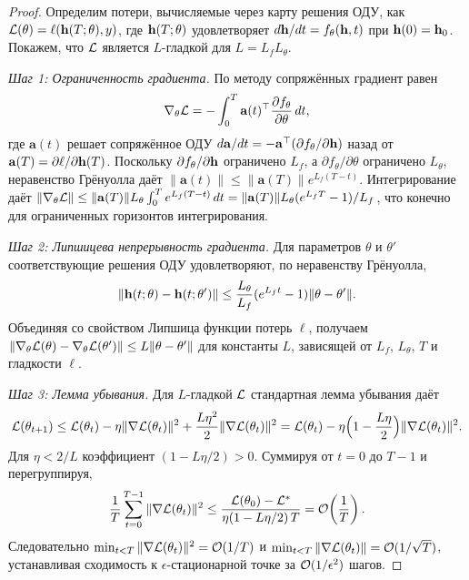 \begin{proof}
Определим потери, вычисляемые через карту решения ОДУ, как $\mathcal{L}(\theta) = \ell(\mathbf{h}(T;\theta),y)$, где $\mathbf{h}(T;\theta)$ удовлетворяет $d\mathbf{h}/dt = f_\theta(\mathbf{h},t)$ при $\mathbf{h}(0)=\mathbf{h}_0$. Покажем, что $\mathcal{L}$ является $L$-гладкой для $L = L_f L_\theta$.

\textit{Шаг 1: Ограниченность градиента.} По методу сопряжённых градиент равен
\begin{equation}
\nabla_\theta\mathcal{L} = -\int_0^T \mathbf{a}(t)^\top \frac{\partial f_\theta}{\partial\theta}\,dt,
\end{equation}
где $\mathbf{a}(t)$ решает сопряжённое ОДУ $d\mathbf{a}/dt = -\mathbf{a}^\top(\partial f_\theta/\partial\mathbf{h})$ назад от $\mathbf{a}(T)=\partial\ell/\partial\mathbf{h}(T)$. Поскольку $\partial f_\theta/\partial\mathbf{h}$ ограничено $L_f$, а $\partial f_\theta/\partial\theta$ ограничено $L_\theta$, неравенство Грёнуолла даёт $\|\mathbf{a}(t)\|\le\|\mathbf{a}(T)\|e^{L_f(T-t)}$. Интегрирование даёт $\|\nabla_\theta\mathcal{L}\|\le \|\mathbf{a}(T)\|L_\theta\int_0^T e^{L_f(T-t)}\,dt = \|\mathbf{a}(T)\|L_\theta(e^{L_f T}-1)/L_f$, что конечно для ограниченных горизонтов интегрирования.

\textit{Шаг 2: Липшицева непрерывность градиента.} Для параметров $\theta$ и $\theta'$ соответствующие решения ОДУ удовлетворяют, по неравенству Грёнуолла,
\begin{equation}
\|\mathbf{h}(t;\theta)-\mathbf{h}(t;\theta')\| \le \frac{L_\theta}{L_f}(e^{L_f t}-1)\|\theta-\theta'\|.
\end{equation}
Объединяя со свойством Липшица функции потерь $\ell$, получаем $\|\nabla_\theta\mathcal{L}(\theta)-\nabla_\theta\mathcal{L}(\theta')\| \le L\|\theta-\theta'\|$ для константы $L$, зависящей от $L_f$, $L_\theta$, $T$ и гладкости $\ell$.

\textit{Шаг 3: Лемма убывания.} Для $L$-гладкой $\mathcal{L}$ стандартная лемма убывания даёт
\begin{equation}
\mathcal{L}(\theta_{t+1}) \le \mathcal{L}(\theta_t) - \eta\|\nabla\mathcal{L}(\theta_t)\|^2 + \frac{L\eta^2}{2}\|\nabla\mathcal{L}(\theta_t)\|^2
= \mathcal{L}(\theta_t) - \eta\Bigl(1-\frac{L\eta}{2}\Bigr)\|\nabla\mathcal{L}(\theta_t)\|^2.
\end{equation}
Для $\eta < 2/L$ коэффициент $(1-L\eta/2)>0$. Суммируя от $t=0$ до $T-1$ и перегруппируя,
\begin{equation}
\frac{1}{T}\sum_{t=0}^{T-1}\|\nabla\mathcal{L}(\theta_t)\|^2
\le \frac{\mathcal{L}(\theta_0)-\mathcal{L}^*}{\eta(1-L\eta/2)\,T}
= \mathcal{O}\!\left(\frac{1}{T}\right).
\end{equation}
Следовательно $\min_{t<T}\|\nabla\mathcal{L}(\theta_t)\|^2 = \mathcal{O}(1/T)$ и $\min_{t<T}\|\nabla\mathcal{L}(\theta_t)\| = \mathcal{O}(1/\sqrt{T})$, устанавливая сходимость к $\epsilon$-стационарной точке за $\mathcal{O}(1/\epsilon^2)$ шагов.
\end{proof}


